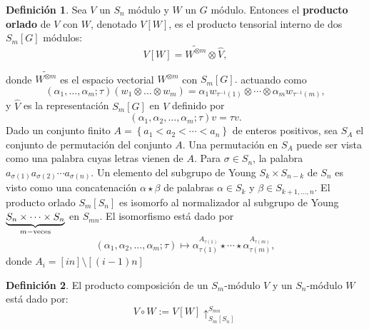 \documentclass[12pt]{book}
\newtheorem{theorem}{Teorema}[section]
\theoremstyle{definition}
\newtheorem{definition}[theorem]{Definición}
\newcounter{in}
\newcounter{ini}
\begin{document}
\begin{definition}
  \label{wre_pro}
  Sea $V$ un $S_n$ módulo y $W$ un $G$ módulo. Entonces el
  \textbf{producto orlado} de $V$ con $W$, denotado
  $V\left [ W \right ]$, es el producto tensorial interno de dos
  $S_m\left [ G \right ]$ módulos:
  $$V \left [ W \right ] = \widetilde{W^{\otimes m}} \otimes \hat{V},$$
\end{definition}
donde $ \widetilde{W^{\otimes m}}$ es el espacio vectorial
$W^{\otimes m}$ con $S_m \left [ G \right ] .$ actuando como
  \begin{equation}
    \label{eq:w_p_1}
    (\alpha_{1},\ldots,\alpha_{m}; \tau)(w_{1} \otimes \ldots \otimes w_{m}) = \alpha_{1}w_{\tau^{-1}(1)} \otimes \cdots \otimes \alpha_{m}w_{\tau^{-1}(m)}, 
  \end{equation}
y $\hat{V}$ es la representación
  $S_m \left [ G \right ]$ en $V$ definido por
  \begin{equation}
    \label{eq:106}
    (\alpha_{1},\alpha_{2},\ldots,\alpha_{m}; \tau)v = \tau v .
  \end{equation}
Dado un conjunto finito
$A = \left \{ a_1 < a_2< \cdots < a_n \right \}$ de enteros positivos,
sea $S_A$ el conjunto de permutación del conjunto $A$. Una permutación
en $S_A$ puede ser vista como una palabra cuyas letras vienen de
$A$. Para $\sigma \in S_n$, la palabra
$a_{\sigma(1)}a_{\sigma(2)} \cdots a_{\sigma(n)}$. Un elemento del
subgrupo de Young $S_{k} \times S_{n-k}$ de $S_n$ es visto como una
concatenación $\alpha \star \beta$ de palabras $\alpha \in S_k$ y
$\beta \in S_{k+1, \ldots, n}$. El producto orlado
$S_m \left [ S_n \right ]$ es isomorfo al normalizador al subgrupo de
Young $\underset{m-\textup{veces}}{\underbrace{S_n \times \cdots \times S_n}}$ en
$S_{mn}$. El isomorfismo está dado por
\begin{equation}
  \label{eq:107}
  (\alpha_{1},\alpha_{2},\ldots,\alpha_{m}; \tau) \mapsto \alpha_{\tau(1)}^{A_{\tau(1)}} \star \cdots \star \alpha_{\tau(m)}^{A_{\tau(m)}},
\end{equation}
donde $A_{i} = \left [ in \right ] \setminus  \left [ (i-1)n \right ]$
\begin{definition}
  El producto composición de un $S_{m}$-módulo $V$ y un $S_{n}$-módulo
  $W$ está dado por:
  \begin{equation}
    \label{eq:108}
    V \circ W := V \left [ W \right ] \uparrow^{S_{mn}}_{S_m \left [ S_n \right ]}
  \end{equation}
\end{definition}
\end{document}
